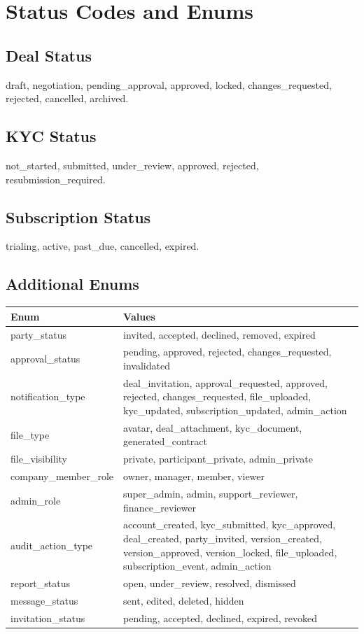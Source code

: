 \chapter{Status Codes and Enums}
\section{Deal Status}
draft, negotiation, pending\_approval, approved, locked, changes\_requested, rejected, cancelled, archived.
\section{KYC Status}
not\_started, submitted, under\_review, approved, rejected, resubmission\_required.
\section{Subscription Status}
trialing, active, past\_due, cancelled, expired.
\section{Additional Enums}
\begin{longtable}{p{}p{}}
\toprule
Enum & Values \\
\midrule
party\_status & invited, accepted, declined, removed, expired \\
approval\_status & pending, approved, rejected, changes\_requested, invalidated \\
notification\_type & deal\_invitation, approval\_requested, approved, rejected, changes\_requested, file\_uploaded, kyc\_updated, subscription\_updated, admin\_action \\
file\_type & avatar, deal\_attachment, kyc\_document, generated\_contract \\
file\_visibility & private, participant\_private, admin\_private \\
company\_member\_role & owner, manager, member, viewer \\
admin\_role & super\_admin, admin, support\_reviewer, finance\_reviewer \\
audit\_action\_type & account\_created, kyc\_submitted, kyc\_approved, deal\_created, party\_invited, version\_created, version\_approved, version\_locked, file\_uploaded, subscription\_event, admin\_action \\
report\_status & open, under\_review, resolved, dismissed \\
message\_status & sent, edited, deleted, hidden \\
invitation\_status & pending, accepted, declined, expired, revoked \\
\bottomrule
\end{longtable}
